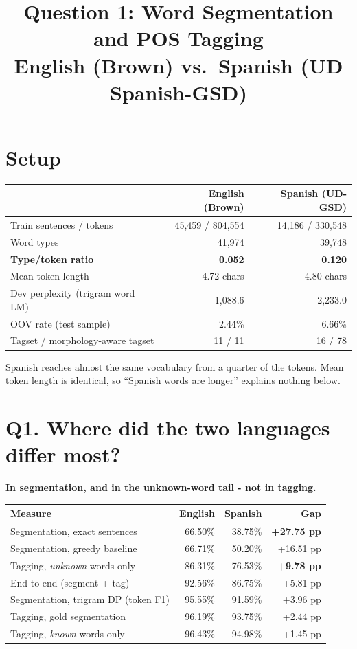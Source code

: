 \documentclass[11pt,a4paper]{article}
\title{Question 1: Word Segmentation and POS Tagging\\
\large English (Brown) vs.\ Spanish (UD Spanish-GSD)}
\date{}
\begin{document}
\maketitle
\vspace{-2.5em}

\section*{Setup}

\begin{center}
\begin{tabular}{lrr}
\toprule
& English (Brown) & Spanish (UD-GSD) \\
\midrule
Train sentences / tokens & 45{,}459 / 804{,}554 & 14{,}186 / 330{,}548 \\
Word types & 41{,}974 & 39{,}748 \\
\textbf{Type/token ratio} & \textbf{0.052} & \textbf{0.120} \\
Mean token length & 4.72 chars & 4.80 chars \\
Dev perplexity (trigram word LM) & 1{,}088.6 & 2{,}233.0 \\
OOV rate (test sample) & 2.44\% & 6.66\% \\
Tagset / morphology-aware tagset & 11 / 11 & 16 / 78 \\
\bottomrule
\end{tabular}
\end{center}

\noindent Spanish reaches almost the same vocabulary from a quarter of the
tokens. Mean token length is identical, so ``Spanish words are longer'' explains
nothing below.

\section*{Q1. Where did the two languages differ most?}

\textbf{In segmentation, and in the unknown-word tail - not in tagging.}

\begin{center}
\begin{tabular}{lrrr}
\toprule
Measure & English & Spanish & Gap \\
\midrule
Segmentation, exact sentences & 66.50\% & 38.75\% & \textbf{+27.75 pp} \\
Segmentation, greedy baseline & 66.71\% & 50.20\% & +16.51 pp \\
Tagging, \emph{unknown} words only & 86.31\% & 76.53\% & \textbf{+9.78 pp} \\
End to end (segment + tag) & 92.56\% & 86.75\% & +5.81 pp \\
Segmentation, trigram DP (token F1) & 95.55\% & 91.59\% & +3.96 pp \\
Tagging, gold segmentation & 96.19\% & 93.75\% & +2.44 pp \\
Tagging, \emph{known} words only & 96.43\% & 94.98\% & +1.45 pp \\
\bottomrule
\end{tabular}
\end{center}
\end{document}
